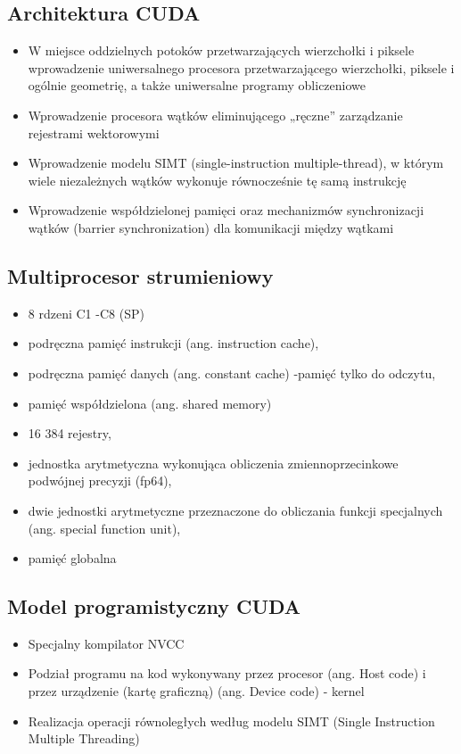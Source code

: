 \documentclass[a4paper,twoside]{article}
\begin{document}
		\subsection*{Architektura CUDA}
		\begin{itemize}
			\item W miejsce oddzielnych potoków przetwarzających wierzchołki i piksele wprowadzenie uniwersalnego procesora przetwarzającego wierzchołki, piksele i ogólnie geometrię, a także uniwersalne programy obliczeniowe
			\item Wprowadzenie procesora wątków eliminującego „ręczne” zarządzanie rejestrami wektorowymi
			\item Wprowadzenie modelu SIMT (single-instruction multiple-thread), w którym wiele niezależnych wątków wykonuje równocześnie tę samą instrukcję
			\item Wprowadzenie współdzielonej pamięci oraz mechanizmów synchronizacji wątków (barrier synchronization) dla komunikacji między wątkami
		\end{itemize}
		\subsection*{Multiprocesor strumieniowy}
		\begin{itemize}
			\item 8 rdzeni C1 -C8 (SP)
			\item podręczna pamięć instrukcji (ang. instruction cache),
			\item podręczna pamięć danych (ang. constant cache) -pamięć tylko do odczytu,
			\item pamięć współdzielona (ang. shared memory)
			\item 16 384 rejestry,
			\item jednostka arytmetyczna wykonująca obliczenia zmiennoprzecinkowe podwójnej precyzji (fp64),
			\item dwie jednostki arytmetyczne przeznaczone do obliczania funkcji specjalnych (ang. special function unit),
			\item pamięć globalna
		\end{itemize}
		\subsection*{Model programistyczny CUDA}
		\begin{itemize}
			\item Specjalny kompilator NVCC
			\item Podział programu na kod wykonywany przez procesor (ang. Host code) i przez urządzenie (kartę graficzną) (ang. Device code) - kernel
			\item Realizacja operacji równoległych według modelu SIMT (Single Instruction Multiple Threading)
		\end{itemize}
\end{document}
